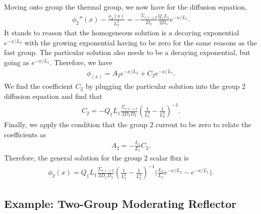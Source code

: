 Moving onto group the thermal group, we now have for the diffusion equation,
\begin{align}
  \phi_2''(x) - \frac{\phi_2(x)}{L_2^2} = -\frac{\Sigma_{s,1 \rightarrow 2}}{D_2} \frac{Q_1 L_1}{2 D_1} e^{-x/L_1} .
\end{align} 
It stands to reason that the homogeneous solution is a decaying exponential $e^{-x/L_2}$ with the growing exponential having to be zero for the same reasons as the fast group. The particular solution also needs to be a decaying exponential, but going as $e^{-x/L_1}$. Therefore, we have
\begin{align}
  \phi_(x) = A_2 e^{-x/L_2} + C_2 e^{-x/L_1} .
\end{align}
We find the coefficient $C_2$ by plugging the particular solution into the group 2 diffusion equation and find that
\begin{align}
  C_2 = -Q_1 L_1 \frac{\Sigma_{s,1 \rightarrow 2}}{ 2 D_1 D_2 } \left( \frac{1}{L_1^2} - \frac{1}{L_2^2} \right)^{-1} .
\end{align}
Finally, we apply the condition that the group 2 current to be zero to relate the coefficients as
\begin{align}
  A_2 = -\frac{L_2}{L_1} C_2 .
\end{align}
Therefore, the general solution for the group 2 scalar flux is
\begin{align}
  \phi_2(x) = Q_1 L_1 \frac{\Sigma_{s,1 \rightarrow 2}}{ 2 D_1 D_2 } \left( \frac{1}{L_1^2} - \frac{1}{L_2^2} \right)^{-1} \bigg( \frac{L_2}{L_1} e^{-x/L_2} - e^{-x/L_1} \bigg) .
\end{align}

\subsection{Example: Two-Group Moderating Reflector}

